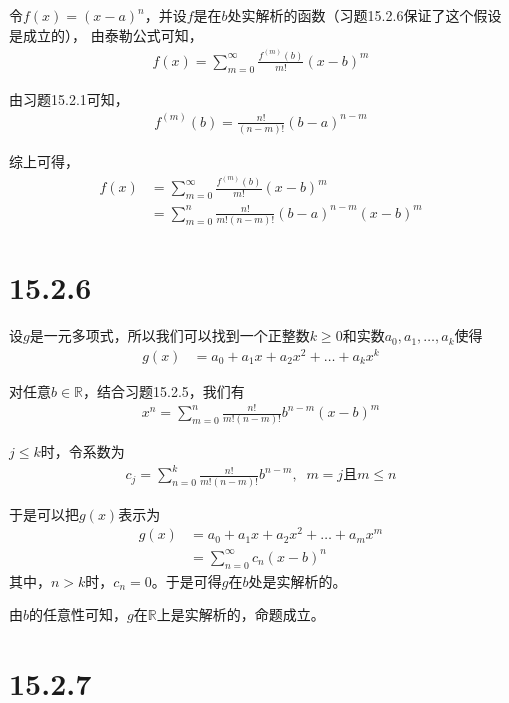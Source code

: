 \documentclass{article}
\begin{document}
令$f(x) = (x - a)^n$，并设$f$是在$b$处实解析的函数（习题15.2.6保证了这个假设是成立的），
由泰勒公式可知，
\begin{align*}
  f(x) = \sum\limits_{m = 0}^\infty \frac{f^{(m)}(b)}{m!}(x - b)^m
\end{align*}

由习题15.2.1可知，
\begin{align*}
  f^{(m)}(b) = \frac{n!}{(n - m)!}(b - a)^{n - m}
\end{align*}

综上可得，
\begin{align*}
  f(x) & = \sum\limits_{m = 0}^\infty \frac{f^{(m)}(b)}{m!}(x - b)^m            \\
       & = \sum\limits_{m = 0}^n \frac{n!}{m!(n - m)!} (b - a)^{n - m}(x - b)^m
\end{align*}

\section*{15.2.6}

设$g$是一元多项式，所以我们可以找到一个正整数$k \geq 0$和实数$a_0, a_1, \dots, a_k$使得
\begin{align*}
  g(x) & = a_0 + a_1x + a_2x^2 + \dots + a_kx^k
\end{align*}

对任意$b \in \mathbb{R}$，结合习题15.2.5，我们有
\begin{align*}
  x^n = \sum\limits_{m = 0}^n \frac{n!}{m!(n - m)!} b^{n - m}(x - b)^m
\end{align*}

$j \leq k$时，令系数为
\begin{align*}
  c_j = \sum\limits_{n = 0}^k \frac{n!}{m!(n - m)!} b^{n - m}, \;\; m = j \text{且} m \leq n
\end{align*}

于是可以把$g(x)$表示为
\begin{align*}
  g(x) & = a_0 + a_1x + a_2x^2 + \dots + a_mx^m    \\
       & = \sum\limits_{n = 0}^\infty c_n(x - b)^n
\end{align*}
其中，$n > k$时，$c_n = 0$。于是可得$g$在$b$处是实解析的。

由$b$的任意性可知，$g$在$\mathbb{R}$上是实解析的，命题成立。

\section*{15.2.7}
\end{document}
